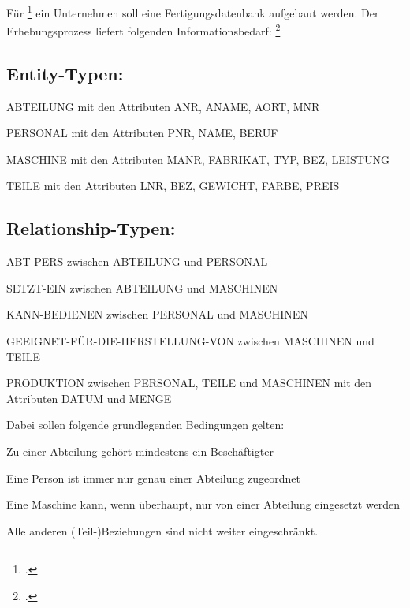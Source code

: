 \documentclass{bschlangaul-aufgabe}
\begin{document}

Für \footcite[Aufgabe
3]{examen:66111:1997:09} ein Unternehmen soll eine Fertigungsdatenbank
aufgebaut werden. Der Erhebungsprozess liefert folgenden
Informationsbedarf:
\footcite[Aufgabe 4]{db:ab:7}

\subsection{Entity-Typen:}

\begin{compactitem}
\item ABTEILUNG mit den Attributen ANR, ANAME, AORT, MNR
\item PERSONAL mit den Attributen PNR, NAME, BERUF
\item MASCHINE mit den Attributen MANR, FABRIKAT, TYP, BEZ, LEISTUNG
\item TEILE mit den Attributen LNR, BEZ, GEWICHT, FARBE, PREIS
\end{compactitem}

\subsection{Relationship-Typen:}

\begin{compactitem}
\item ABT-PERS zwischen ABTEILUNG und PERSONAL
\item SETZT-EIN zwischen ABTEILUNG und MASCHINEN
\item KANN-BEDIENEN zwischen PERSONAL und MASCHINEN
\item GEEIGNET-FÜR-DIE-HERSTELLUNG-VON zwischen MASCHINEN und TEILE
\item PRODUKTION zwischen PERSONAL, TEILE und MASCHINEN mit den Attributen
DATUM und MENGE
\end{compactitem}

Dabei sollen folgende grundlegenden Bedingungen gelten:

\begin{compactitem}
\item Zu einer Abteilung gehört mindestens ein Beschäftigter

\item Eine Person ist immer nur genau einer Abteilung zugeordnet

\item Eine Maschine kann, wenn überhaupt, nur von einer Abteilung
eingesetzt werden

\item Alle anderen (Teil-)Beziehungen sind nicht weiter eingeschränkt.
\end{compactitem}
\end{document}
